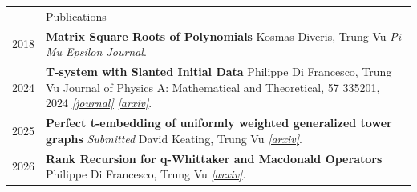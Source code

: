 \documentclass[letterpaper, 11pt]{article}
\newcommand{\headingfont}{\Large\color{Red}}
\newenvironment{SectionTable}[1]{
	\renewcommand*{\arraystretch}{1.7}
	\setlength{\tabcolsep}{10pt}
	\begin{longtable}{Rp{5.2in}} & #1 \\}
	{\end{longtable}\vspace{-.3cm}}
\begin{document}
	
	\begin{SectionTable}{\headingfont Publications} 
		2018 & 
		\textbf{Matrix Square Roots of Polynomials} \newline
		Kosmas Diveris, Trung Vu \newline
		\textit{Pi Mu Epsilon Journal}. \\

		2024 & 
			\textbf{T-system with Slanted Initial Data} \newline
			Philippe Di Francesco, Trung Vu \newline
			Journal of Physics A: Mathematical and Theoretical, 57 335201, 2024 \textit{\href{https://iopscience.iop.org/article/10.1088/1751-8121/ad65a5}{[journal]}} \newline
			\textit{\href{https://arxiv.org/abs/2403.02479}{[arxiv]}}. \\
		
		2025 &
		\textbf{Perfect t-embedding of uniformly weighted generalized tower graphs} \textit{Submitted} \newline
		David Keating, Trung Vu \newline
		\textit{\href{https://arxiv.org/abs/2509.18791}{[arxiv]}}. \\

		2026 &
		\textbf{Rank Recursion for q-Whittaker and Macdonald Operators}\newline
		Philippe Di Francesco, Trung Vu \newline
		\textit{\href{https://arxiv.org/abs/2606.12796}{[arxiv]}}. 

		
		
	\end{SectionTable}
	
\end{document}
